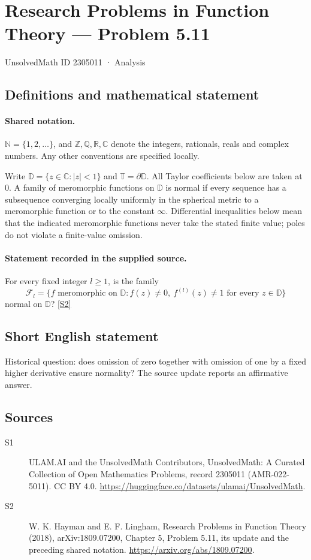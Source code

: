 \documentclass[11pt]{article}
\newcommand{\sref}[2]{\hyperlink{source:#1:#2}{[S#2]}}
\begin{document}
\setcounter{section}{2305010}
\section{Research Problems in Function Theory — Problem 5.11}\label{2305011}
{\small\sffamily UnsolvedMath ID 2305011 · Analysis}
\subsection{Definitions and mathematical statement}

\paragraph{Shared notation.}$\mathbb N=\{1,2,\ldots\}$, and $\mathbb Z,\mathbb Q,\mathbb R,\mathbb C$ denote the integers, rationals, reals and complex numbers. Any other conventions are specified locally.


Write $\mathbb D=\{z\in\mathbb C:|z|<1\}$ and $\mathbb T=\partial\mathbb D$. All Taylor coefficients below are taken at $0$. A family of meromorphic functions on $\mathbb D$ is normal if every sequence has a subsequence converging locally uniformly in the spherical metric to a meromorphic function or to the constant $\infty$. Differential inequalities below mean that the indicated meromorphic functions never take the stated finite value; poles do not violate a finite-value omission.
\paragraph{Statement recorded in the supplied source.}
For every fixed integer $l\ge1$, is the family
\[\mathcal F_l=\{f\text{ meromorphic on }\mathbb D:f(z)\ne0,\ f^{(l)}(z)\ne1\text{ for every }z\in\mathbb D\}\]
normal on $\mathbb D$? \sref{2305011}{2}
\subsection{Short English statement}
Historical question: does omission of zero together with omission of one by a fixed higher derivative ensure normality? The source update reports an affirmative answer.
\subsection{Sources}
\begin{description}
\item[\hypertarget{source:2305011:1}{S1}] ULAM.AI and the UnsolvedMath Contributors, UnsolvedMath: A Curated Collection of Open Mathematics Problems, record 2305011 (AMR-022-5011). CC BY 4.0. \url{https://huggingface.co/datasets/ulamai/UnsolvedMath}.
\item[\hypertarget{source:2305011:2}{S2}] W. K. Hayman and E. F. Lingham, Research Problems in Function Theory (2018), arXiv:1809.07200, Chapter 5, Problem 5.11, its update and the preceding shared notation. \url{https://arxiv.org/abs/1809.07200}.
\end{description}
\label{end:2305011}
\end{document}
